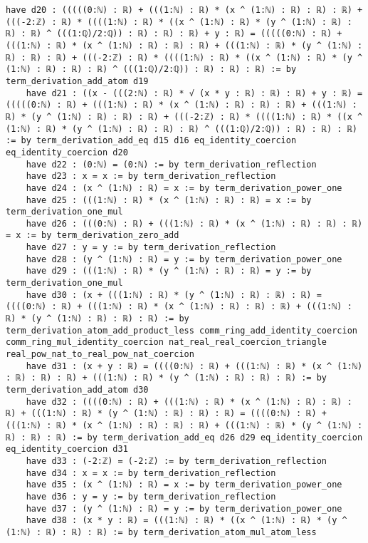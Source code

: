 \documentclass{article}
\begin{document}
\begin{tcolorbox}[colback=white!10, width=\linewidth]
\begin{lstlisting}[language=Lean4]
    have d20 : (((((0:ℕ) : ℝ) + (((1:ℕ) : ℝ) * (x ^ (1:ℕ) : ℝ) : ℝ) : ℝ) + (((-2:ℤ) : ℝ) * ((((1:ℕ) : ℝ) * ((x ^ (1:ℕ) : ℝ) * (y ^ (1:ℕ) : ℝ) : ℝ) : ℝ) ^ (((1:ℚ)/2:ℚ)) : ℝ) : ℝ) : ℝ) + y : ℝ) = (((((0:ℕ) : ℝ) + (((1:ℕ) : ℝ) * (x ^ (1:ℕ) : ℝ) : ℝ) : ℝ) + (((1:ℕ) : ℝ) * (y ^ (1:ℕ) : ℝ) : ℝ) : ℝ) + (((-2:ℤ) : ℝ) * ((((1:ℕ) : ℝ) * ((x ^ (1:ℕ) : ℝ) * (y ^ (1:ℕ) : ℝ) : ℝ) : ℝ) ^ (((1:ℚ)/2:ℚ)) : ℝ) : ℝ) : ℝ) := by term_derivation_add_atom d19
    have d21 : ((x - (((2:ℕ) : ℝ) * √ (x * y : ℝ) : ℝ) : ℝ) + y : ℝ) = (((((0:ℕ) : ℝ) + (((1:ℕ) : ℝ) * (x ^ (1:ℕ) : ℝ) : ℝ) : ℝ) + (((1:ℕ) : ℝ) * (y ^ (1:ℕ) : ℝ) : ℝ) : ℝ) + (((-2:ℤ) : ℝ) * ((((1:ℕ) : ℝ) * ((x ^ (1:ℕ) : ℝ) * (y ^ (1:ℕ) : ℝ) : ℝ) : ℝ) ^ (((1:ℚ)/2:ℚ)) : ℝ) : ℝ) : ℝ) := by term_derivation_add_eq d15 d16 eq_identity_coercion eq_identity_coercion d20
    have d22 : (0:ℕ) = (0:ℕ) := by term_derivation_reflection
    have d23 : x = x := by term_derivation_reflection
    have d24 : (x ^ (1:ℕ) : ℝ) = x := by term_derivation_power_one
    have d25 : (((1:ℕ) : ℝ) * (x ^ (1:ℕ) : ℝ) : ℝ) = x := by term_derivation_one_mul
    have d26 : (((0:ℕ) : ℝ) + (((1:ℕ) : ℝ) * (x ^ (1:ℕ) : ℝ) : ℝ) : ℝ) = x := by term_derivation_zero_add
    have d27 : y = y := by term_derivation_reflection
    have d28 : (y ^ (1:ℕ) : ℝ) = y := by term_derivation_power_one
    have d29 : (((1:ℕ) : ℝ) * (y ^ (1:ℕ) : ℝ) : ℝ) = y := by term_derivation_one_mul
    have d30 : (x + (((1:ℕ) : ℝ) * (y ^ (1:ℕ) : ℝ) : ℝ) : ℝ) = ((((0:ℕ) : ℝ) + (((1:ℕ) : ℝ) * (x ^ (1:ℕ) : ℝ) : ℝ) : ℝ) + (((1:ℕ) : ℝ) * (y ^ (1:ℕ) : ℝ) : ℝ) : ℝ) := by term_derivation_atom_add_product_less comm_ring_add_identity_coercion comm_ring_mul_identity_coercion nat_real_real_coercion_triangle real_pow_nat_to_real_pow_nat_coercion
    have d31 : (x + y : ℝ) = ((((0:ℕ) : ℝ) + (((1:ℕ) : ℝ) * (x ^ (1:ℕ) : ℝ) : ℝ) : ℝ) + (((1:ℕ) : ℝ) * (y ^ (1:ℕ) : ℝ) : ℝ) : ℝ) := by term_derivation_add_atom d30
    have d32 : ((((0:ℕ) : ℝ) + (((1:ℕ) : ℝ) * (x ^ (1:ℕ) : ℝ) : ℝ) : ℝ) + (((1:ℕ) : ℝ) * (y ^ (1:ℕ) : ℝ) : ℝ) : ℝ) = ((((0:ℕ) : ℝ) + (((1:ℕ) : ℝ) * (x ^ (1:ℕ) : ℝ) : ℝ) : ℝ) + (((1:ℕ) : ℝ) * (y ^ (1:ℕ) : ℝ) : ℝ) : ℝ) := by term_derivation_add_eq d26 d29 eq_identity_coercion eq_identity_coercion d31
    have d33 : (-2:ℤ) = (-2:ℤ) := by term_derivation_reflection
    have d34 : x = x := by term_derivation_reflection
    have d35 : (x ^ (1:ℕ) : ℝ) = x := by term_derivation_power_one
    have d36 : y = y := by term_derivation_reflection
    have d37 : (y ^ (1:ℕ) : ℝ) = y := by term_derivation_power_one
    have d38 : (x * y : ℝ) = (((1:ℕ) : ℝ) * ((x ^ (1:ℕ) : ℝ) * (y ^ (1:ℕ) : ℝ) : ℝ) : ℝ) := by term_derivation_atom_mul_atom_less

\end{lstlisting}
\end{tcolorbox}
\end{document}
